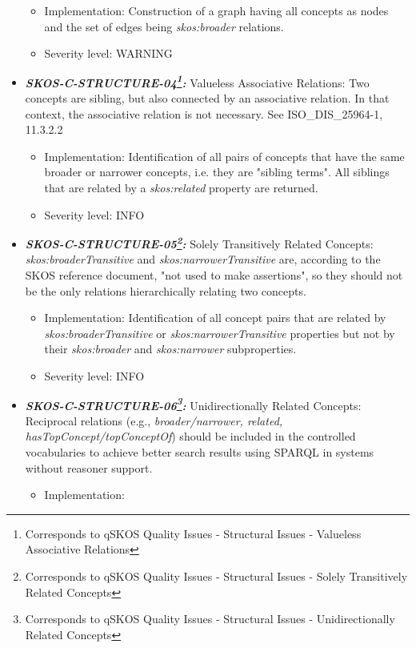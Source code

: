 \documentclass{llncs}
\begin{document}
\begin{itemize}
	\begin{itemize}
		\item Implementation: Construction of a graph having all concepts as nodes and the set of edges being \emph{skos:broader} relations. 
		\item Severity level: WARNING
\end{itemize}
	\item \textbf{{\em SKOS-C-STRUCTURE-04\footnote{Corresponds to qSKOS Quality Issues - Structural Issues - Valueless Associative Relations}:}}
	Valueless Associative Relations:
	Two concepts are sibling, but also connected by an associative relation. In that context, the associative relation is not necessary. See ISO\_DIS\_25964-1, 11.3.2.2 
	\begin{itemize}
		\item Implementation:
		Identification of all pairs of concepts that have the same broader or narrower concepts, i.e. they are "sibling terms". All siblings that are related by a \emph{skos:related} property are returned. 
	  \item Severity level: INFO
\end{itemize}
	\item \textbf{{\em SKOS-C-STRUCTURE-05\footnote{Corresponds to qSKOS Quality Issues - Structural Issues - Solely Transitively Related Concepts}:}}
	Solely Transitively Related Concepts:
	\emph{skos:broaderTransitive} and \emph{skos:narrowerTransitive} are, according to the SKOS reference document, "not used to make assertions", so they should not be the only relations hierarchically relating two concepts. 
	\begin{itemize}
		\item Implementation: Identification of all concept pairs that are related by \emph{skos:broaderTransitive} or \emph{skos:narrowerTransitive} properties but not by their \emph{skos:broader} and \emph{skos:narrower} subproperties. 
		\item Severity level: INFO
\end{itemize}
	\item \textbf{{\em SKOS-C-STRUCTURE-06\footnote{Corresponds to qSKOS Quality Issues - Structural Issues - Unidirectionally Related Concepts}:}}
	Unidirectionally Related Concepts:
	Reciprocal relations (e.g., \emph{broader/narrower, related, hasTopConcept/topConceptOf}) should be included in the controlled vocabularies to achieve better search results using SPARQL in systems without reasoner support. 
	\begin{itemize}
		\item Implementation:

\end{itemize}
\end{itemize}
\end{document}
